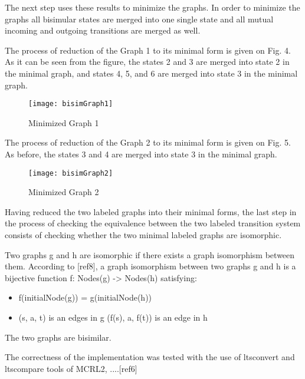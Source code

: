 The next step uses these results to minimize the graphs. In order to minimize the graphs all bisimular states are merged into
one single state and all mutual incoming and outgoing transitions are merged as well.

The process of reduction of the Graph 1 to its minimal form is given on Fig. 4. As it can be seen from the figure, the states 
2 and 3 are merged into state 2 in the minimal graph, and states 4, 5, and 6 are merged into state 3 in the minimal graph.
\begin{figure}[h!]
\centering
\texttt{[image: bisimGraph1]}
\caption{Minimized Graph 1}
\label{fig:bisimGraph1}
\end{figure}

The process of reduction of the Graph 2 to its minimal form is given on Fig. 5. As before, the states 
3 and 4 are merged into state 3 in the minimal graph.
\begin{figure}[h!]
\centering
\texttt{[image: bisimGraph2]}
\caption{Minimized Graph 2}
\label{fig:bisimGraph2}
\end{figure}

Having reduced the two labeled graphs into their minimal forms, the last step in the process of checking the equivalence
between the two labeled transition system consists of checking whether the two minimal labeled graphs are isomorphic.

Two graphs g and h are isomorphic if there exists a graph isomorphism between them. According to [ref8], a graph isomorphism 
between two graphs g and h is a bijective function f: Nodes(g) -> Nodes(h) satisfying:
\begin{itemize}
	\item f(initialNode(g)) = g(initialNode(h))
	\item (s, a, t) is an edges in g \Leftrightarrow (f(s), a, f(t)) is an edge in h
\end{itemize}

The two graphs are bisimilar.

The correctness of the implementation was tested with the use of ltsconvert and ltscompare tools of MCRL2, ....[ref6]

